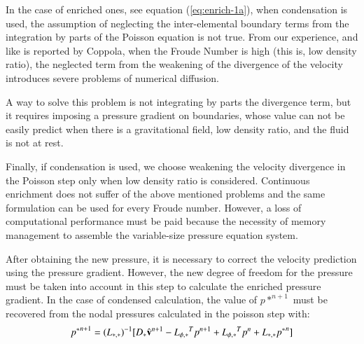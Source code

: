 
In the case of enriched ones, see equation (\ref{eq:enrich-1a}), when condensation is used, the assumption of neglecting the inter-elemental boundary terms from the integration by parts of the Poisson equation is not true. From our experience, and like is reported by Coppola\cite{Coppola05}, when the Froude Number is high (this is, low density ratio), the neglected term from the weakening of the divergence of the velocity introduces severe problems of numerical diffusion.

A way to solve this problem is not integrating by parts the divergence term, but it requires imposing a pressure gradient on boundaries, whose value can not be easily predict when there is a gravitational field, low density ratio, and the fluid is not at rest.

Finally, if condensation is used, we choose weakening the velocity divergence in the Poisson step only when low density ratio is considered. Continuous enrichment does not suffer of the above mentioned problems and the same formulation can be used for every
Froude number. However, a loss of computational performance must be paid because the necessity of memory management to assemble the variable-size pressure equation system.


%

After obtaining the new pressure, it is necessary to correct the velocity prediction using the pressure gradient. However, the new degree of freedom for the pressure must be taken into account in this step to calculate the enriched pressure gradient. In the case of condensed calculation, the value of $p*^{n+1}$ must be recovered from the nodal pressures calculated in the poisson step with:
\begin{equation}
  {p^*}^{n+1} = {(L_{*,*})}^{-1}[D_* \hat{\mathbf{v}}^{n+1} - {L_{\phi,*}}^Tp^{n+1} + {L_{\phi,*}}^Tp^{n} + L_{*,*}{p^*}^n]
  \label{recovering}
\end{equation}

